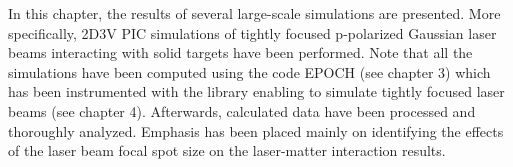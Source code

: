 In this chapter, the results of several large-scale simulations are presented. More specifically, 2D3V PIC simulations of tightly focused p-polarized Gaussian laser beams interacting with solid targets have been performed. Note that all the simulations have been computed using the code EPOCH (see chapter 3) which has been instrumented with the library enabling to simulate tightly focused laser beams (see chapter 4). Afterwards, calculated data have been processed and thoroughly analyzed. Emphasis has been placed mainly on identifying the effects of the laser beam focal spot size on the laser-matter interaction results.